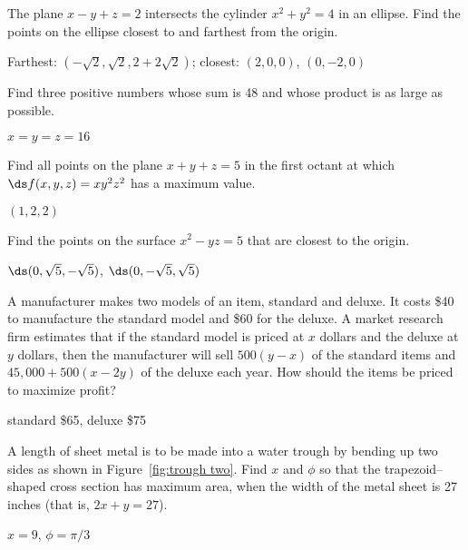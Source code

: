 \begin{enumialphparenastyle}
\begin{ex}
The plane $x-y+z=2$ intersects the cylinder $x^2+y^2=4$ in an
ellipse. Find the points on the ellipse closest to and farthest from
the origin.
\begin{sol}
Farthest: $(-\sqrt2,\sqrt2,2+2\sqrt2)$; closest:
$(2,0,0)$, $(0,-2,0)$
\end{sol}
\end{ex}

\begin{ex}
Find three positive numbers whose sum is 48 and whose
product is as large as possible.
\begin{sol}
$x=y=z=16$
\end{sol}
\end{ex}

\begin{ex}
Find all points on the plane $x+y+z = 5$ in the first octant at
which $\ds f(x,y,z) = xy^2z^2$ has a maximum value.
\begin{sol}
$(1,2,2)$
\end{sol}
\end{ex}

\begin{ex}
Find the points on the surface $x^2 -yz = 5$ that are closest to the
origin.
\begin{sol}
$\ds (0,\sqrt{5},-\sqrt{5})$, $\ds (0,-\sqrt{5},\sqrt{5})$
\end{sol}
\end{ex}

\begin{ex}
A manufacturer makes two models of an item, standard and deluxe.  It
costs \$40 to manufacture the standard model and \$60 for the deluxe.  A
market research firm estimates that if the standard model is priced at $x$
dollars and the deluxe at $y$ dollars, then the manufacturer will sell
$500(y-x)$ of the standard items and $45,000+500(x-2y)$ of the deluxe each
year.  How should the items be priced to maximize profit?
\begin{sol}
standard \$65, deluxe \$75
\end{sol}
\end{ex}

\begin{ex}
A length of sheet metal is to be made into a
water trough by bending up two sides as shown in
Figure~\ref{fig:trough two}.  Find $x$ and $\phi$ so that the
trapezoid--shaped cross section has maximum area, when
the width of the metal sheet is 27 inches (that is, $2x+y=27$).
\begin{sol}
$x=9$, $\phi=\pi/3$
\end{sol}


\end{ex}
\end{enumialphparenastyle}
